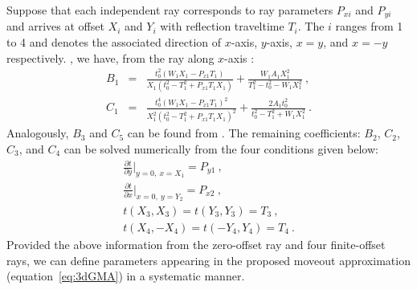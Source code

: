 Suppose that each independent  ray corresponds to ray parameters $P_{xi}$ and $P_{yi}$ and arrives at offset $X_i$ and $Y_i$ with reflection traveltime $T_i$. The $i$  ranges from 1 to 4 and denotes the associated  direction of $x$-axis, $y$-axis, $x=y$, and $x=-y$ respectively. , we have, from the ray along $x$-axis  \cite[]{fomelstovas}:
\begin{eqnarray}
\label{eq:b1}
B_1 & = & \frac{t_0^2(W_1X_1-P_{x1} T_1)}{X_1 (t_0^2-T_1^2+P_{x1} T_1X_1)} + \frac{W_1A_1 X_1^2}{T_1^2-t^2_0-W_1X_1^2}~,\\
\label{eq:c1}
C_1 & = & \frac{t_0^4(W_1X_1-P_{x1} T_1)^2}{X_1^2 (t_0^2-T_1^2+P_{x1} T_1X_1)^2} + \frac{2A_1 t^2_0}{t^2_0-T_1^2+W_1X_1^2}~.
\end{eqnarray}
Analogously, $B_3$ and $C_5$ can be found from . The remaining coefficients: $B_2$, $C_2$, $C_3$, and $C_4$ can be solved numerically from the four conditions given below:
\begin{eqnarray}
  \frac{\partial t}{\partial y}|_{y=0,~x=X_1} =  P_{y1} ~,\\
  \frac{\partial t}{\partial x}|_{x=0,~y=Y_2} = P_{x2} ~,\\
  t(X_3,X_3) = t(Y_3,Y_3) = T_3 ~,\\
   \label{eq:restcoeff}
  t(X_4,-X_4) = t(-Y_4,Y_4) = T_4 ~.
\end{eqnarray}
Provided the above information from the zero-offset ray and four finite-offset rays, we can define  parameters appearing in the proposed moveout approximation (equation~\ref{eq:3dGMA}) in a systematic manner.



